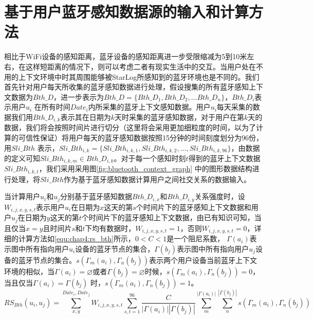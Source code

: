 \section{基于用户蓝牙感知数据源的输入和计算方法}
\label{sec:bl_input}
相比于WiFi设备的感知距离，蓝牙设备的感知距离进一步受限缩减为5到10米左右，在这样短距离的情况下，则可以考虑二者有现实生活中的交互。当用户处在不用的上下文环境中时其周围能够被StarLog所感知到的蓝牙环境也是不同的。我们首先针对用户每天所收集的蓝牙感知数据进行处理，假设搜集的所有蓝牙感知上下文数据为$Bth\_D$，进一步表示为$Bth\_D=\{Bth\_D_{1},Bth\_D_{2},...Bth\_D_{n} \}$，$Bth\_D_{i}$表示用户$u_{i}$ 在所有时间$Date_{i}$内所采集的蓝牙上下文感知数据。用户$u_{i}$每天采集的数据我们用$Bth\_D_{i,k}$表示其在日期为$k$天时采集的蓝牙感知数据，对于用户在第$k$天的数据，我们将会按照时间片进行切分（这里将会采用更加细粒度的时间，以为了计算的可信性保证）将用户每天的蓝牙感知数据按照15分钟的时间刻度划分为96份，用$Sli\_Bth$ 表示，$Sli\_Bth_{i,k}=\{Sli\_Bth_{i,k,1},Sli\_Bth_{i,k,2},...,Sli\_Bth_{i,k,96}\}$，由数据的定义可知$Sli\_Bth_{i,k,m} \in Bth\_D_{i,k}$。对于每一个感知时刻$t$得到的蓝牙上下文数据$Sli\_Bth_{i,k,t}$，我们采用采用图\ref{fig:bluetooth_context_graph} 中的图形数据结构进行处理，将$Sli\_Bth$作为基于蓝牙感知数据计算用户之间社交关系的数据输入。

\par 当计算用户$u_{i}$和$u_{j}$分别基于蓝牙感知数据$Bth\_D_{i,x}$和$Bth\_D_{i,y}$关系强度时，设$W_{i,j,x,y,s,t}$表示用户$u_{i}$在日期为$x$这天的第$s$个时间片下的蓝牙感知上下文数据和用户$u_{j}$在日期为$y$这天的第$t$个时间片下的蓝牙感知上下文数据，由已有知识可知，当且仅当$x=y$且时间片$s$和$t$下均有数据时，$W_{i,j,x,y,s,t}=1$，否则$W_{i,j,x,y,s,t}=0$，详细的计算方法如\ref{equ:chap4:rs_bth}所示，$0< C<1$是一个阻尼系数， $\Gamma (a_{i}) $表示图中所有指向用户$u_{i}$设备的蓝牙节点的集合，$\Gamma (b_{j}) $表示图中所有指向用户$u_{j}$设备的蓝牙节点的集合。$s(\Gamma_{m} (a_{i}),\Gamma_{n} (b_{j}))$表示两个用户设备当前蓝牙上下文环境的相似，当$\Gamma (a_{i})= \varnothing $或者$\Gamma (b_{j})=\varnothing $时候，$s(\Gamma_{m} (a_{i}),\Gamma_{n} (b_{j}))=0$，当且仅当$\Gamma (a_{i})=\Gamma (b_{j})$ 时，$s(\Gamma_{m} (a_{i}),\Gamma_{n} (b_{j}))=1$。
\begin{equation}
\label{equ:chap4:rs_bth}
RS_{Bth}(u_{i},u_{j})=\sum_{x ,y }^{ Date_{i}, Date_{j}}W_{i,j,x,y,s,t}\sum_{s,t=1}^{96} \frac{C}{ \left |\Gamma (a_{i})  \right |\left |\Gamma (b_{j})  \right | } \sum_{m}^{\left |\Gamma (a_{i})  \right |}  \sum_{n}^{\left |\Gamma (b_{j})  \right |}s(\Gamma_{m} (a_{i}),\Gamma_{n} (b_{j}))
\end{equation}

